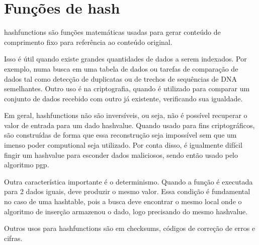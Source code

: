 
\section{Funções de hash}
\label{sec:sha1}

\begin{comment}
Aqui vou explicar como funciona o algoritmo da \gls{hashfunction} SHA-1 e mostrar como
e para que é usado na identificação de torrents e na verificação de integridade de
partes.
\end{comment}

\Glspl{hashfunction} são funções matemáticas usadas para gerar conteúdo de comprimento
fixo para referência ao conteúdo original.

Isso é útil quando existe grandes quantidades de dados a serem indexados. Por exemplo,
numa busca em uma tabela de dados ou tarefas de comparação de dados tal como detecção de
duplicatas ou de trechos de sequências de DNA semelhantes. Outro uso é na criptografia,
quando é utilizado para comparar um conjunto de dados recebido com outro já existente,
verificando sua igualdade.

Em geral, \glspl*{hashfunction} não são inversíveis, ou seja, não é possível recuperar o
valor de entrada para um dado \gls{hashvalue}. Quando usado para fins criptográficos,
são construídas de forma que essa reconstrução seja impossível sem que um imenso poder
computional seja utilizado. Por conta disso, é igualmente difícil fingir um
\gls*{hashvalue} para esconder dados maliciosos, sendo então usado pelo algoritmo
\gls{pgp}.

Outra característica importante é o determinismo. Quando a função é executada para 2
dados iguais, deve produzir o mesmo valor. Essa condição é fundamental no caso de uma
\gls*{hashtable}, pois a busca deve encontrar o mesmo local onde o algoritmo de inserção
armazenou o dado, logo precisando do mesmo \gls*{hashvalue}.

Outros usos para \glspl*{hashfunction} são em \glspl{checksum}, códigos de correção de
erros e cifras.

